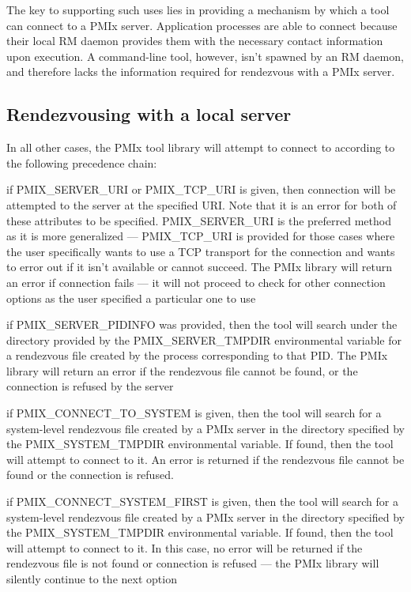 The key to supporting such uses lies in providing a mechanism by which a tool can connect to a \ac{PMIx} server. Application processes are able to connect because their local \ac{RM} daemon provides them with the necessary contact information upon execution. A command-line tool, however, isn't spawned by an \ac{RM} daemon, and therefore lacks the information required for rendezvous with a \ac{PMIx} server.

\subsection{Rendezvousing with a local server}

In all other cases, the PMIx tool library will attempt to connect to according to the following precedence chain:

if PMIX_SERVER_URI or PMIX_TCP_URI is given, then connection will be attempted to the server at the specified URI. Note that it is an error for both of these attributes to be specified. PMIX_SERVER_URI is the preferred method as it is more generalized — PMIX_TCP_URI is provided for those cases where the user specifically wants to use a TCP transport for the connection and wants to error out if it isn’t available or cannot succeed. The PMIx library will return an error if connection fails — it will not proceed to check for other connection options as the user specified a particular one to use

if PMIX_SERVER_PIDINFO was provided, then the tool will search under the directory provided by the PMIX_SERVER_TMPDIR environmental variable for a rendezvous file created by the process corresponding to that PID. The PMIx library will return an error if the rendezvous file cannot be found, or the connection is refused by the server

if PMIX_CONNECT_TO_SYSTEM is given, then the tool will search for a system-level rendezvous file created by a PMIx server in the directory specified by the PMIX_SYSTEM_TMPDIR environmental variable. If found, then the tool will attempt to connect to it. An error is returned if the rendezvous file cannot be found or the connection is refused.

if PMIX_CONNECT_SYSTEM_FIRST is given, then the tool will search for a system-level rendezvous file created by a PMIx server in the directory specified by the PMIX_SYSTEM_TMPDIR environmental variable. If found, then the tool will attempt to connect to it. In this case, no error will be returned if the rendezvous file is not found or connection is refused — the PMIx library will silently continue to the next option

